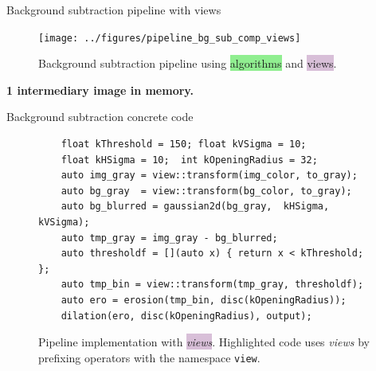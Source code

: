\documentclass[12pt,aspectratio=169]{beamer}
\begin{document}
\begin{frame}[fragile]{Background subtraction pipeline with views}
  \begin{figure}[htbp]
    \centering
    \texttt{[image: ../figures/pipeline\_bg\_sub\_comp\_views]}
    \caption{Background subtraction pipeline using \colorbox{lightgreen}{algorithms} and
      \colorbox{thistle}{views}.}
  \end{figure}
  \begin{center}\textbf{1 intermediary image in memory.}\end{center}
  \pdfcomment[icon=Note]{   }
\end{frame}

\begin{frame}[fragile]{Background subtraction concrete code}
  \begin{figure}
    \begin{verbatim}
    float kThreshold = 150; float kVSigma = 10;
    float kHSigma = 10;  int kOpeningRadius = 32;
    auto img_gray = view::transform(img_color, to_gray);
    auto bg_gray  = view::transform(bg_color, to_gray);
    auto bg_blurred = gaussian2d(bg_gray,  kHSigma, kVSigma);
    auto tmp_gray = img_gray - bg_blurred;
    auto thresholdf = [](auto x) { return x < kThreshold; };
    auto tmp_bin = view::transform(tmp_gray, thresholdf);
    auto ero = erosion(tmp_bin, disc(kOpeningRadius));
    dilation(ero, disc(kOpeningRadius), output);
    \end{verbatim}
    \caption{Pipeline implementation with \colorbox{thistle}{\emph{views}}. Highlighted code uses \emph{views} by
      prefixing operators with the namespace \texttt{view}.}
    \label{fig:view.comp.sub_bg.view_code}
  \end{figure}
  \pdfcomment[icon=Note]{   }
\end{frame}
\end{document}
